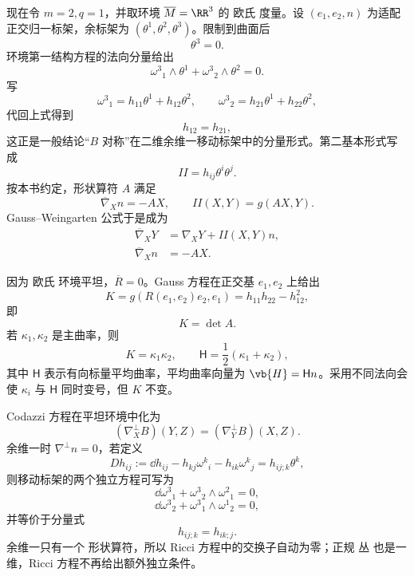 现在令 $m=2,q=1$，并取环境 $\overline M=\RR^3$ 的 欧氏 度量。设 $(e_1,e_2,n)$ 为适配正交归一标架，余标架为 $(\theta^1,\theta^2,\theta^3)$。限制到曲面后
\[
\theta^3=0.
\]
环境第一结构方程的法向分量给出
\begin{equation*}\omega^3{}_1\wedge\theta^1
+\omega^3{}_2\wedge\theta^2=0.
\end{equation*}
写
\[
\omega^3{}_1=h_{11}\theta^1+h_{12}\theta^2,
\qquad
\omega^3{}_2=h_{21}\theta^1+h_{22}\theta^2,
\]
代回上式得到
\begin{equation*}h_{12}=h_{21},
\end{equation*}
这正是一般结论“$B$ 对称”在二维余维一移动标架中的分量形式。第二基本形式写成
\begin{equation*}II=h_{ij}\theta^i\theta^j.
\end{equation*}
按本书约定，形状算符 $A$ 满足
\[
\overline\nabla_Xn=-AX,
\qquad
II(X,Y)=g(AX,Y).
\]
Gauss--Weingarten 公式于是成为
\begin{equation*}{
\begin{aligned}
\overline\nabla_XY&=\nabla_XY+II(X,Y)n,\\
\overline\nabla_Xn&=-AX.
\end{aligned}}
\end{equation*}

因为 欧氏 环境平坦，$\overline R=0$。Gauss 方程在正交基 $e_1,e_2$ 上给出
\[
K
=g(R(e_1,e_2)e_2,e_1)
=h_{11}h_{22}-h_{12}^2,
\]
即
\begin{equation*}{K=\det A.}
\end{equation*}
若 $\kappa_1,\kappa_2$ 是主曲率，则
\[
K=\kappa_1\kappa_2,
\qquad
\mathsf H=\frac12(\kappa_1+\kappa_2),
\]
其中 $\mathsf H$ 表示有向标量平均曲率，平均曲率向量为 $\vb{H}=\mathsf H n$。采用不同法向会使 $\kappa_i$ 与 $\mathsf H$ 同时变号，但 $K$ 不变。

Codazzi 方程在平坦环境中化为
\[
(\nabla_X^\perp B)(Y,Z)
=(\nabla_Y^\perp B)(X,Z).
\]
余维一时 $\nabla^\perp n=0$，若定义
\[
Dh_{ij}
:=\dd h_{ij}-h_{kj}\omega^k{}_i-h_{ik}\omega^k{}_j
=h_{ij;k}\theta^k,
\]
则移动标架的两个独立方程可写为
\begin{equation*}\dd\omega^3{}_1+\omega^3{}_2\wedge\omega^2{}_1=0,
\end{equation*}
\begin{equation*}\dd\omega^3{}_2+\omega^3{}_1\wedge\omega^1{}_2=0,
\end{equation*}
并等价于分量式
\begin{equation*}{h_{ij;k}=h_{ik;j}.}
\end{equation*}
余维一只有一个 形状算符，所以 Ricci 方程中的交换子自动为零；正规 丛 也是一维，Ricci 方程不再给出额外独立条件。

